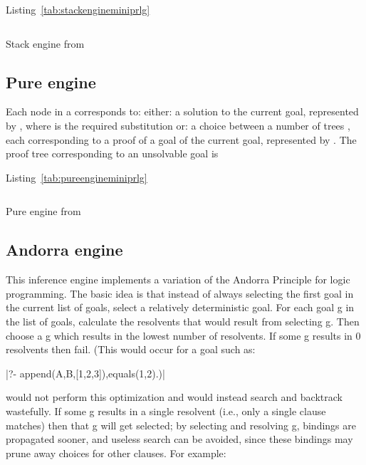 \documentclass[thesis-solanki.tex]{files}
\begin{document}
Listing~\ref{tab:stackengineminiprlg}

\begin{code-list}[H]
\begin{singlespace}
\inputminted[linenos, firstline=29, lastline=56]{haskell}{haskell-proto3-sudsy-woe.hs}
\end{singlespace}
\caption{Stack engine from \cite{website:mini-prolog-hugs98}}
\label{tab:stackengineminiprlg}
\end{code-list}

\subsection{Pure engine}
 Each node in a  corresponds to:
 either: a solution to the current goal, represented by , where 
         is the required substitution
 or:     a choice between a number of trees , each corresponding to a
         proof of a goal of the current goal, represented by .
         The proof tree corresponding to an unsolvable goal is  

Listing~\ref{tab:pureengineminiprlg}

\begin{code-list}[H]
\begin{singlespace}
\inputminted[linenos, firstline=26, lastline=46]{haskell}{haskell-proto3-absurd-silicon.hs}
\end{singlespace}
\caption{Pure engine from \cite{website:mini-prolog-hugs98}}
\label{tab:pureengineminiprlg}
\end{code-list}

\subsection{Andorra engine}
This inference engine implements a variation of the Andorra Principle for
  logic programming. The basic
  idea is that instead of always selecting the first goal in the current
  list of goals, select a relatively deterministic goal.
For each goal g in the list of goals, calculate the resolvents that would
result from selecting g.  Then choose a g which results in the lowest
number of resolvents.  If some g results in 0 resolvents then fail.
(This would occur for a goal such as:  

|?- append(A,B,[1,2,3]),equals(1,2).)|

 would not perform this optimization and would instead search
and backtrack wastefully.  If some g results in a single resolvent
(i.e., only a single clause matches) then that g will get selected;
by selecting and resolving g, bindings are propagated sooner, and useless
search can be avoided, since these bindings may prune away choices for
other clauses.  For example: 
\end{document}
